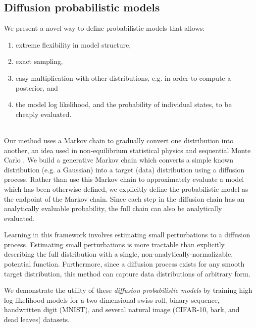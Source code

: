 \documentclass{article}
\begin{document}
\subsection{Diffusion probabilistic models}
We present a novel way to define probabilistic models that allows:\\[-2.2em]
\begin{enumerate}\itemsep1pt \parskip0pt 
  \item extreme flexibility in model structure,
  \item exact sampling,
  \item easy multiplication with other distributions, e.g. in order to compute a posterior, and
  \item the model log likelihood, and the probability of individual states, to be cheaply evaluated.
\end{enumerate}
~\\[-2.3em]
Our method uses a Markov chain to gradually convert one distribution into another, an idea used in non-equilibrium statistical physics \cite{Jarzynski:1997p12846} and sequential Monte Carlo \cite{Neal:AIS}. We build a generative Markov chain which converts a simple known distribution (e.g. a Gaussian) into a target 
(data) distribution using a diffusion process. Rather than use this Markov chain to approximately evaluate a model which 
has been otherwise defined, we explicitly define the probabilistic model as the endpoint of the Markov chain. Since each step in the diffusion 
chain has an analytically evaluable probability, the full chain can also be analytically evaluated.

Learning in this framework involves estimating small perturbations to a diffusion process. Estimating small %
perturbations is 
more tractable than explicitly describing the full distribution with a single, non-analytically-normalizable, potential function.  Furthermore, since a diffusion 
process exists for any smooth target distribution, this method can capture data distributions of arbitrary form.

We demonstrate the utility of these \textit{diffusion probabilistic models} by training high log likelihood models for a two-dimensional swiss roll, binary sequence, handwritten digit (MNIST), and several natural image (CIFAR-10, bark, and dead leaves) datasets.
\end{document}
